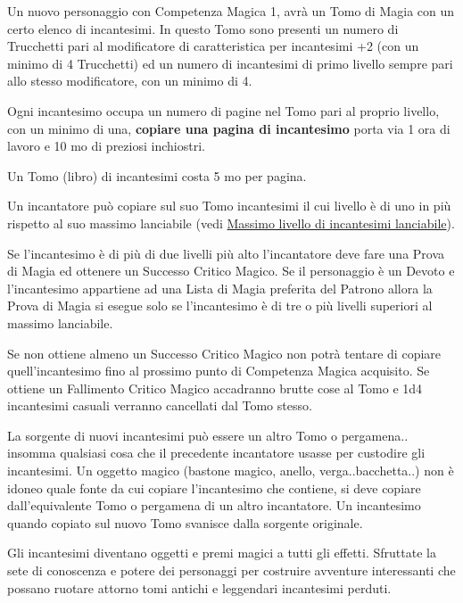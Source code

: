 \begin{multicols}{2}
Un nuovo personaggio con Competenza Magica 1, avrà un Tomo di Magia con un certo elenco di incantesimi. In questo Tomo sono presenti un numero di Trucchetti pari al modificatore di caratteristica per incantesimi +2 (con un minimo di 4 Trucchetti) ed un numero di incantesimi di primo livello sempre pari allo stesso modificatore, con un minimo di 4.\label{tomocm1}\hypertarget{tomocm1}{}

Ogni incantesimo occupa un numero di pagine nel Tomo pari al proprio livello, con un minimo di una, \textbf{copiare una pagina di incantesimo} porta via 1 ora di lavoro e 10 mo di preziosi inchiostri.

Un Tomo (libro) di incantesimi costa 5 mo per pagina.

Un incantatore può copiare sul suo Tomo incantesimi il cui livello è di uno in più rispetto al suo massimo lanciabile (vedi \hyperlink{scuoleelivelli}{Massimo livello di incantesimi lanciabile}).

Se l'incantesimo è di più di due livelli più alto l'incantatore deve fare una Prova di Magia ed ottenere un Successo Critico Magico. Se il personaggio è un Devoto e l'incantesimo appartiene ad una Lista di Magia preferita del Patrono allora la Prova di Magia si esegue solo se l'incantesimo è di tre o più livelli superiori al massimo lanciabile.

Se non ottiene almeno un Successo Critico Magico non potrà tentare di copiare quell'incantesimo fino al prossimo punto di Competenza Magica acquisito. Se ottiene un Fallimento Critico Magico accadranno brutte cose al Tomo e 1d4 incantesimi casuali verranno cancellati dal Tomo stesso.

La sorgente di nuovi incantesimi può essere un altro Tomo o pergamena.. insomma qualsiasi cosa che il precedente incantatore usasse per custodire gli incantesimi. Un oggetto magico (bastone magico, anello, verga..bacchetta..) non è idoneo quale fonte da cui copiare l'incantesimo che contiene, si deve copiare dall'equivalente Tomo o pergamena di un altro incantatore. Un incantesimo quando copiato sul nuovo Tomo svanisce dalla sorgente originale.

\begin{changemargin}{0.3cm}{0.3cm}\begin{narratore}
Gli incantesimi diventano oggetti e premi magici a tutti gli effetti. Sfruttate la sete di conoscenza e potere dei personaggi per costruire avventure interessanti che possano ruotare attorno tomi antichi e leggendari incantesimi perduti.
\end{narratore}\end{changemargin}


\end{multicols}
